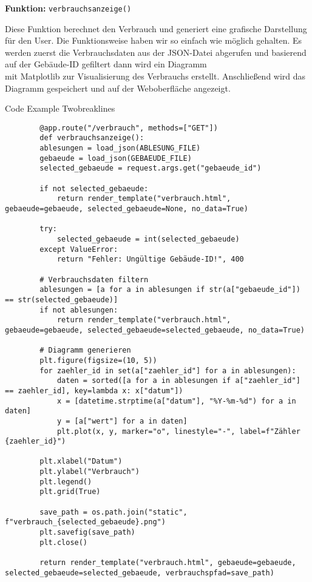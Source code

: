 \textbf{Funktion: }\texttt{verbrauchsanzeige()}

Diese Funktion berechnet den Verbrauch und generiert eine grafische Darstellung für den User.
Die Funktionsweise haben wir so einfach wie möglich gehalten.
Es werden zuerst die Verbrauchsdaten aus der JSON-Datei abgerufen und basierend auf der Gebäude-ID gefiltert dann wird ein Diagramm\\
mit Matplotlib zur Visualisierung des Verbrauchs erstellt.
Anschließend wird das Diagramm gespeichert und auf der Weboberfläche angezeigt.

\begin{code}{Code Example Two}{breaklines}
    \begin{verbatim}
        @app.route("/verbrauch", methods=["GET"])
        def verbrauchsanzeige():
        ablesungen = load_json(ABLESUNG_FILE)
        gebaeude = load_json(GEBAEUDE_FILE)
        selected_gebaeude = request.args.get("gebaeude_id")

        if not selected_gebaeude:
            return render_template("verbrauch.html", gebaeude=gebaeude, selected_gebaeude=None, no_data=True)

        try:
            selected_gebaeude = int(selected_gebaeude)
        except ValueError:
            return "Fehler: Ungültige Gebäude-ID!", 400

        # Verbrauchsdaten filtern
        ablesungen = [a for a in ablesungen if str(a["gebaeude_id"]) == str(selected_gebaeude)]
        if not ablesungen:
            return render_template("verbrauch.html", gebaeude=gebaeude, selected_gebaeude=selected_gebaeude, no_data=True)

        # Diagramm generieren
        plt.figure(figsize=(10, 5))
        for zaehler_id in set(a["zaehler_id"] for a in ablesungen):
            daten = sorted([a for a in ablesungen if a["zaehler_id"] == zaehler_id], key=lambda x: x["datum"])
            x = [datetime.strptime(a["datum"], "%Y-%m-%d") for a in daten]
            y = [a["wert"] for a in daten]
            plt.plot(x, y, marker="o", linestyle="-", label=f"Zähler {zaehler_id}")

        plt.xlabel("Datum")
        plt.ylabel("Verbrauch")
        plt.legend()
        plt.grid(True)

        save_path = os.path.join("static", f"verbrauch_{selected_gebaeude}.png")
        plt.savefig(save_path)
        plt.close()

        return render_template("verbrauch.html", gebaeude=gebaeude, selected_gebaeude=selected_gebaeude, verbrauchspfad=save_path)

    \end{verbatim}
\end{code}

